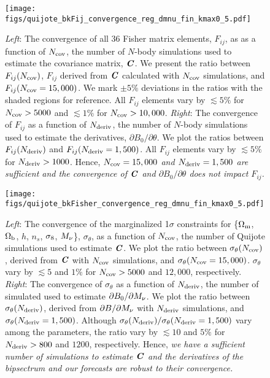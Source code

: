 \begin{figure}
\begin{center}
    \texttt{[image: figs/quijote\_bkFij\_convergence\_reg\_dmnu\_fin\_kmax0\_5.pdf]}
    \caption{
        {\em Left}: The convergence of all 36 Fisher matrix elements, $F_{ij}$, as 
        as a function of $N_{\rm cov}$, the number of $N$-body simulations used to 
        estimate the covariance matrix, $\textbf{\textit{C}}$. We present the ratio between 
        $F_{ij}(N_{\rm cov})$, $F_{ij}$ derived from $\textbf{\textit{C}}$ calculated with 
        $N_{\rm cov}$ simulations, and $F_{ij}(N_{\rm cov} = 15,000)$. We mark 
        $\pm5\%$ deviations in the ratios with the shaded regions for reference. 
        All $F_{ij}$ elements vary by $\lesssim 5\%$ for $N_{\rm cov} > 5000$ and 
        $\lesssim 1\%$ for $N_{\rm cov} > 10,000$.
        {\em Right}: The convergence of $F_{ij}$ as a function of $N_{\rm deriv}$, 
        the number of $N$-body simulations used to estimate the derivatives, 
        $\partial B_0/\partial \theta$. We plot the ratios between $F_{ij}(N_{\rm deriv})$ 
        and $F_{ij}(N_{\rm deriv} = 1,500)$. All $F_{ij}$ elements vary by 
        $\lesssim 5\%$ for $N_{\rm deriv} > 1000$. Hence, {\em $N_{\rm cov} = 15,000$ 
        and $N_{\rm deriv} = 1,500$ are sufficient and the convergence of $\textbf{\textit{C}}$ 
        and $\partial B_0/\partial \theta$ does not impact $F_{ij}$.}
    }
\label{fig:fij_converge}
\end{center}
\end{figure}

\begin{figure}
\begin{center}
    \texttt{[image: figs/quijote\_bkFisher\_convergence\_reg\_dmnu\_fin\_kmax0\_5.pdf]} 
    \caption{{\em Left}: The convergence of the marginalized 1$\sigma$ constraints
    for \{$\Omega_{\rm m}$, $\Omega_{\rm b}$, $h$, $n_s$, $\sigma_8$, $M_\nu$\}, $\sigma_\theta$, as a function of 
    $N_{\rm cov}$, the number of Quijote simulations used to estimate $\textbf{\textit{C}}$. We 
    plot the ratio between $\sigma_\theta(N_{\rm cov})$, derived from $\textbf{\textit{C}}$ with 
    $N_{\rm cov}$ simulations, and $\sigma_\theta(N_{\rm cov} = 15,000)$. $\sigma_\theta$ vary by $\lesssim 5$ and $1\%$ for 
    $N_{\rm cov} > 5000$ and $12,000$, respectively. 
    {\em Right}: The convergence of $\sigma_\theta$ as a function of $N_{\rm deriv}$, 
    the number of simulated used to estimate $\partial B_0/\partial M_\nu$. We plot 
    the ratio between $\sigma_\theta(N_{\rm deriv})$, derived from $\partial B/\partial M_\nu$
    with $N_{\rm deriv}$ simulations, and $\sigma_\theta(N_{\rm deriv} = 1,500)$. Although 
    $\sigma_\theta(N_{\rm deriv})/\sigma_\theta(N_{\rm deriv} = 1,500)$ vary among 
    the parameters, the ratio vary by $\lesssim 10$ and $5\%$ for $N_{\rm deriv} > 800$ 
    and $1200$, respectively. Hence, {\em we have a sufficient number of simulations 
    to estimate $\textbf{\textit{C}}$ and the derivatives of the bipsectrum and our forecasts are 
    robust to their convergence.} 
    }
\label{fig:converge}
\end{center}
\end{figure}

